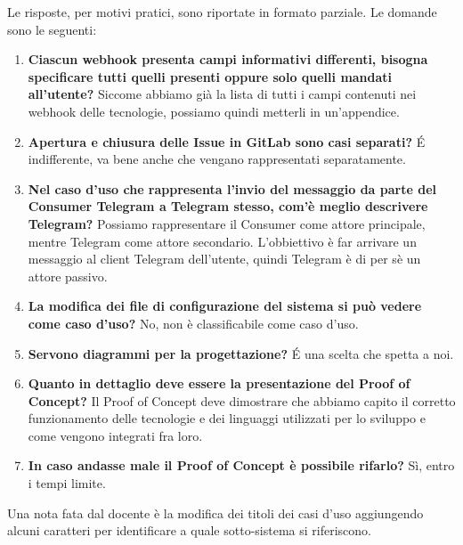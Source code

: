    	Le risposte, per motivi pratici, sono riportate in formato parziale. Le domande sono le seguenti:
    	
    	\begin{enumerate}
    		\item \textbf{Ciascun webhook presenta campi informativi differenti, bisogna specificare tutti quelli presenti oppure solo quelli mandati all'utente?} Siccome abbiamo già la lista di tutti i campi contenuti nei webhook delle tecnologie, possiamo quindi metterli in un'appendice.
    		\item \textbf{Apertura e chiusura delle Issue in GitLab sono casi separati?} \'E indifferente, va bene anche che vengano rappresentati separatamente.
    		\item \textbf{Nel caso d'uso che rappresenta l'invio del messaggio da parte del Consumer Telegram a Telegram stesso, com'è meglio descrivere Telegram?} Possiamo rappresentare il Consumer come attore principale, mentre Telegram come attore secondario. L'obbiettivo è far arrivare un messaggio al client Telegram dell'utente, quindi Telegram è di per sè un attore passivo.
    		\item \textbf{La modifica dei file di configurazione del sistema si può vedere come caso d'uso?} No, non è classificabile come caso d'uso.
    		\item \textbf{Servono diagrammi per la progettazione?} \'E una scelta che spetta a noi.
    		\item \textbf{Quanto in dettaglio deve essere la presentazione del Proof of Concept?} Il Proof of Concept deve dimostrare che abbiamo capito il corretto funzionamento delle tecnologie e dei linguaggi utilizzati per lo sviluppo e come vengono integrati fra loro.
    		\item \textbf{In caso andasse male il Proof of Concept è possibile rifarlo?} Sì, entro i tempi limite.
    	\end{enumerate}
    	Una nota fata dal docente è la modifica dei titoli dei casi d'uso aggiungendo alcuni caratteri per identificare a quale sotto-sistema si riferiscono.
